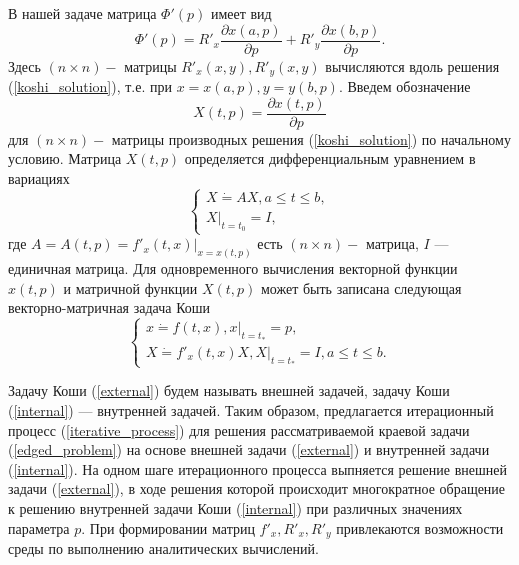 В нашей задаче матрица $\Phi'(p)$ имеет вид
\begin{equation*}
\Phi'(p)=R'_x\frac{\partial x(a,p)}{\partial p}+R'_y\frac{\partial x(b,p)}{\partial p}.
\end{equation*}
Здесь $(n\times n) -$ матрицы $R'_x(x,y), R'_y(x,y)$ вычисляются вдоль решения (\ref{koshi_solution}), т.е. при $x=x(a,p), y=y(b,p).$ Введем обозначение
\begin{equation*}
X(t,p)=\frac{\partial x(t,p)}{\partial p} 
\end{equation*}
для $(n\times n) -$ матрицы производных решения (\ref{koshi_solution}) по начальному условию. Матрица $X(t,p)$ определяется дифференциальным уравнением в вариациях
\begin{equation*}
\begin{cases}
X\dot=AX, a\leq t\leq b,\\
X|_{t=t_0}=I,
\end{cases}
\end{equation*}
где $A=A(t,p)=f'_x(t,x)|_{x=x(t,p)}$ есть $(n\times n) -$ матрица, $I$ --- единичная матрица. Для одновременного вычисления векторной функции $x(t,p)$ и матричной функции $X(t, p)$ может быть записана следующая векторно-матричная задача Коши
\begin{equation}
\label{internal}
\begin{cases}
x\dot=f(t,x), x|_{t=t_*}=p,\\
X\dot=f'_x(t,x)X, X|_{t=t_*}=I, a\leq t\leq b.
\end{cases}
\end{equation}

Задачу Коши (\ref{external}) будем называть {\if внешней задачей}, задачу Коши (\ref{internal}) —
{\if внутренней задачей}. Таким образом, предлагается итерационный процесс (\ref{iterative_process}) для решения рассматриваемой краевой задачи (\ref{edged_problem}) на основе внешней задачи (\ref{external}) и внутренней задачи (\ref{internal}). На одном шаге итерационного процесса выпняется решение внешней задачи (\ref{external}), в ходе решения которой происходит многократное обращение к решению внутренней задачи Коши (\ref{internal}) при различных значениях параметра $p$. При формировании
матриц $f'_x, R'_x, R'_y$ привлекаются возможности среды по выполнению аналитических вычислений.
\newpage
